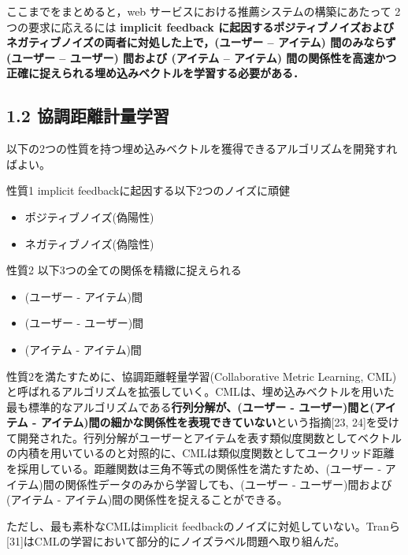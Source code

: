 \documentclass[11pt,a4paper]{article}
\begin{document}
ここまでをまとめると，web サービスにおける推薦システムの構築にあたって 2 つの要求に応えるには \textbf{implicit feedback に起因するポジティブノイズおよびネガティブノイズの両者に対処した上で，(ユーザー – アイテム) 間のみならず (ユーザー – ユーザー) 間および (アイテム – アイテム) 間の関係性を高速かつ正確に捉えられる埋め込みベクトルを学習する必要がある．}

\subsection*{1.2 協調距離計量学習}

以下の2つの性質を持つ埋め込みベクトルを獲得できるアルゴリズムを開発すればよい。

性質1 implicit feedbackに起因する以下2つのノイズに頑健
\begin{itemize}
  \item ポジティブノイズ(偽陽性)
  \item ネガティブノイズ(偽陰性)
\end{itemize}

性質2 以下3つの全ての関係を精緻に捉えられる
\begin{itemize}
  \item (ユーザー - アイテム)間
  \item (ユーザー - ユーザー)間
  \item (アイテム - アイテム)間
\end{itemize}

性質2を満たすために、協調距離軽量学習(Collaborative Metric Learning, CML)と呼ばれるアルゴリズムを拡張していく。CMLは、埋め込みベクトルを用いた最も標準的なアルゴリズムである\textbf{行列分解が、(ユーザー - ユーザー)間と(アイテム - アイテム)間の細かな関係性を表現できていない}という指摘[23, 24]を受けて開発された。行列分解がユーザーとアイテムを表す類似度関数としてベクトルの内積を用いているのと対照的に、CMLは類似度関数としてユークリッド距離を採用している。距離関数は三角不等式の関係性を満たすため、(ユーザー - アイテム)間の関係性データのみから学習しても、(ユーザー - ユーザー)間および(アイテム - アイテム)間の関係性を捉えることができる。

ただし、最も素朴なCMLはimplicit feedbackのノイズに対処していない。Tranら[31]はCMLの学習において部分的にノイズラベル問題へ取り組んだ。
\end{document}
